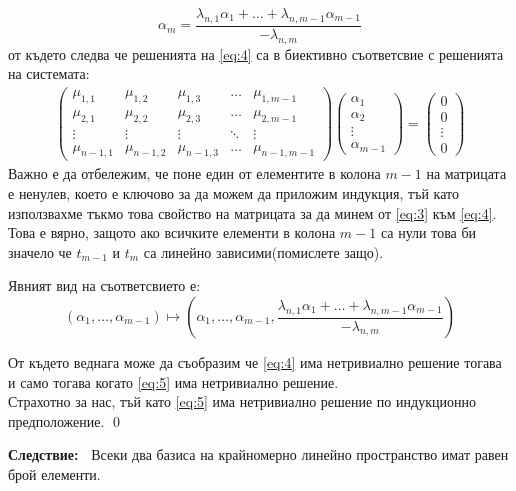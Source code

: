 \documentclass[a4paper,12pt,fleqn]{article}
\begin{document}
{\begin{equation*}
        \alpha_{m}=\frac{\lambda_{n,1}\alpha_{1}+\dots+\lambda_{n,m-1}\alpha_{m-1}}{-\lambda_{n,m}}
      \end{equation*}
      от където следва че решенията на \eqref{eq:4} са в биективно съответсвие с решенията на системата:
      \begin{gather} \label{eq:5}
        \begin{pmatrix}
          \mu_{1, 1} & \mu_{1, 2} & \mu_{1, 3} & \dots & \mu_{1,m-1} \\
          \mu_{2, 1} & \mu_{2, 2} & \mu_{2, 3} & \dots & \mu_{2,m-1} \\
          \vdots & \vdots & \vdots & \ddots & \vdots \\
          \mu_{n-1, 1} & \mu_{n-1, 2} & \mu_{n-1, 3} & \dots & \mu_{n-1,m-1}
        \end{pmatrix}
        \begin{pmatrix}
          \alpha_{1} \\
          \alpha_{2} \\
          \vdots \\
          \alpha_{m-1}
        \end{pmatrix}
        =
        \begin{pmatrix}
          0 \\
          0 \\
          \vdots \\
          0
        \end{pmatrix}
      \end{gather} 
      Важно е да отбележим, че поне един от елементите в колона \( m-1 \) на матрицата е ненулев, което е ключово за да можем да приложим индукция, тъй като използвахме тъкмо това свойство на матрицата за да минем от \eqref{eq:3} към \eqref{eq:4}. Това е вярно, защото ако всичките елементи в колона \( m-1 \) са нули това би значело че \( t_{m-1} \) и \( t_{m} \) са линейно зависими(помислете защо).

      Явният вид на съответсвието е:
      \begin{equation*}
        \left( \alpha_{1},\dots,\alpha_{m-1} \right) \longmapsto \left( \alpha_{1},\dots,\alpha_{m-1}, \frac{\lambda_{n,1}\alpha_{1}+\dots+\lambda_{n,m-1}\alpha_{m-1}}{-\lambda_{n,m}}\right)
      \end{equation*}

      От където веднага може да съобразим че \eqref{eq:4} има нетривиално решение тогава и само тогава когато \eqref{eq:5} има нетривиално решение. \\
      Страхотно за нас, тъй като \eqref{eq:5} има нетривиално решение по индукционно предположение.
      \qed
    }

    \textbf{Следствие:~} Всеки два базиса на крайномерно линейно пространство имат равен брой елементи.



    
\end{document}
